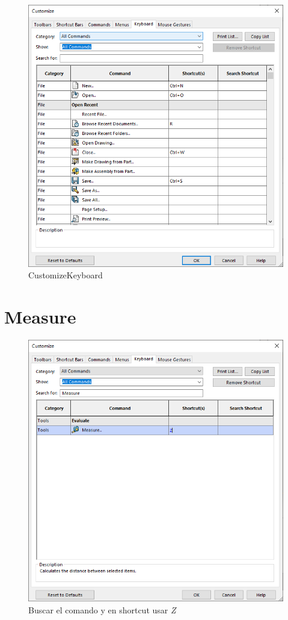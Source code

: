 \documentclass{report}
\begin{document}
\begin{figure}[H]
	\centering
	\includegraphics[width=0.85\linewidth, height=0.65\textheight,keepaspectratio]{Imagenes/solidworks_keyboard_01}
	\caption{Customize\textrightarrow Keyboard}
	\label{fig:solidworkskeyboard01}
\end{figure}

\section{Measure}

\begin{figure}[H]
	\centering
	\includegraphics[width=0.85\linewidth, height=0.65\textheight,keepaspectratio]{Imagenes/solidworks_keyboard_02}
	\caption{Buscar el comando y en shortcut usar \emph{Z}}
	\label{fig:solidworkskeyboard02}
\end{figure}
\end{document}
